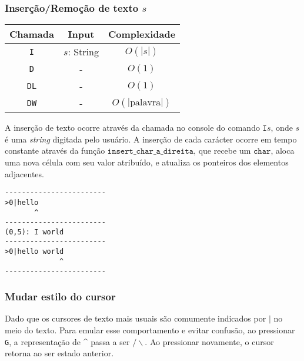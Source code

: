 \documentclass[a4paper, 11pt]{article}
\begin{document}
\subsubsection*{Inserção/Remoção de texto \texorpdfstring{$s$}{s}}

\begin{table}[H]
\centering
\begin{tabular}{|c|c|c|}
\hline
\textbf{Chamada} & \textbf{Input} & \textbf{Complexidade}
\\ 
\hline
\texttt{I} & $s$: String & $O(|s|)$ \\
\texttt{D} & - & $O(1)$ \\
\texttt{DL} & - & $O(1)$ \\
\texttt{DW} & - & $O(|\text{palavra}|)$ \\
\hline
\end{tabular}
\end{table}

A inserção de texto ocorre através da chamada no console do comando $\texttt{I}s$, onde $s$ é uma \textit{string} digitada pelo usuário. A inserção de cada carácter ocorre em tempo constante através da função $\texttt{insert\_char\_a\_direita}$, que recebe um $\texttt{char}$, aloca uma nova célula com seu valor atribuído, e atualiza os ponteiros dos elementos adjacentes.

\begin{center}
      \begin{minipage}{0.45\linewidth}
            \begin{lstlisting}[caption={Exemplo de Inserção de funções}, label={list_exemplo_de_insercao}, language={[ansi]C},firstnumber=1]
------------------------
>0|hello
       ^
------------------------
(0,5): I world
------------------------
>0|hello world
             ^
------------------------
            \end{lstlisting}
      \end{minipage}
\end{center}

\subsubsection*{Mudar estilo do cursor}

Dado que os cursores de texto mais usuais são comumente indicados por $\texttt{|}$ no meio do texto. Para emular esse comportamento e evitar confusão, ao pressionar \texttt{G}, a representação de \textasciicircum\,\,passa a ser $/\backslash$. Ao pressionar novamente, o cursor retorna ao ser estado anterior.
\end{document}

